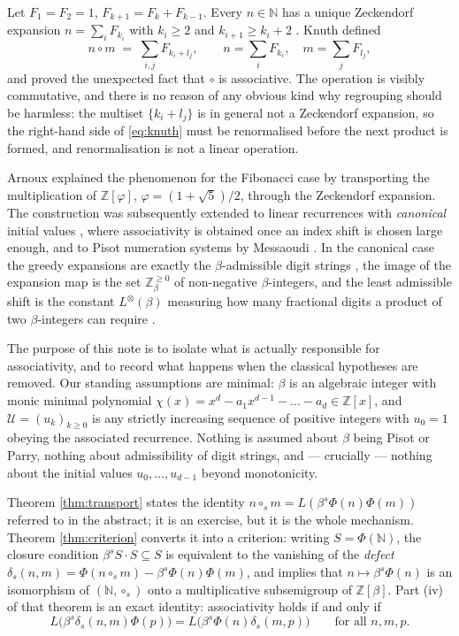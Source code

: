\documentclass[11pt,reqno]{amsart}
\theoremstyle{plain}
\theoremstyle{definition}
\newcommand{\Z}{\mathbb{Z}}
\newcommand{\N}{\mathbb{N}}
\newcommand{\Uu}{\mathcal{U}}
\begin{document}
Let $F_{1}=F_{2}=1$, $F_{k+1}=F_{k}+F_{k-1}$. Every $n\in\N$ has a unique Zeckendorf expansion
$n=\sum_{i}F_{k_{i}}$ with $k_{i}\ge2$ and $k_{i+1}\ge k_{i}+2$ \cite{Zeckendorf}. Knuth
\cite{Knuth} defined
\begin{equation}\label{eq:knuth}
  n\circ m \;=\; \sum_{i,j}F_{k_{i}+l_{j}},
  \qquad n=\sum_{i}F_{k_{i}},\quad m=\sum_{j}F_{l_{j}},
\end{equation}
and proved the unexpected fact that $\circ$ is associative. The operation is visibly commutative,
and there is no reason of any obvious kind why regrouping should be harmless: the multiset
$\{k_{i}+l_{j}\}$ is in general not a Zeckendorf expansion, so the right-hand side of
\eqref{eq:knuth} must be renormalised before the next product is formed, and renormalisation is not
a linear operation.

Arnoux \cite{Arnoux} explained the phenomenon for the Fibonacci case by transporting the
multiplication of $\Z[\varphi]$, $\varphi=(1+\sqrt5)/2$, through the Zeckendorf expansion. The
construction was subsequently extended to linear recurrences with \emph{canonical} initial values
\cite{Grabner}, where associativity is obtained once an index shift is chosen large enough, and to
Pisot numeration systems by Messaoudi \cite{Messaoudi1,Messaoudi2}. In the canonical case the
greedy expansions are exactly the $\beta$-admissible digit strings \cite{Bertrand}, the image of the
expansion map is the set $\Z_{\beta}^{\ge0}$ of non-negative $\beta$-integers, and the least
admissible shift is the constant $L^{\otimes}(\beta)$ measuring how many fractional digits a product
of two $\beta$-integers can require \cite{BFGK,AFMP}.

The purpose of this note is to isolate what is actually responsible for associativity, and to record
what happens when the classical hypotheses are removed. Our standing assumptions are minimal:
$\beta$ is an algebraic integer with monic minimal polynomial
$\chi(x)=x^{d}-a_{1}x^{d-1}-\dots-a_{d}\in\Z[x]$, and $\Uu=(u_{k})_{k\ge0}$ is any strictly
increasing sequence of positive integers with $u_{0}=1$ obeying the associated recurrence. Nothing
is assumed about $\beta$ being Pisot or Parry, nothing about admissibility of digit strings, and ---
crucially --- nothing about the initial values $u_{0},\dots,u_{d-1}$ beyond monotonicity.

Theorem \ref{thm:transport} states the identity
$n\circ_{s}m=L(\beta^{s}\Phi(n)\Phi(m))$ referred to in the abstract; it is an exercise, but it is
the whole mechanism. Theorem \ref{thm:criterion} converts it into a criterion: writing
$S=\Phi(\N)$, the closure condition $\beta^{s}S\cdot S\subseteq S$ is equivalent to the vanishing of
the \emph{defect} $\delta_{s}(n,m)=\Phi(n\circ_{s}m)-\beta^{s}\Phi(n)\Phi(m)$, and implies that
$n\mapsto\beta^{s}\Phi(n)$ is an isomorphism of $(\N,\circ_{s})$ onto a multiplicative subsemigroup
of $\Z[\beta]$. Part (iv) of that theorem is an exact identity: associativity holds if and only if
\[
  L\bigl(\beta^{s}\delta_{s}(n,m)\Phi(p)\bigr)=L\bigl(\beta^{s}\Phi(n)\delta_{s}(m,p)\bigr)
  \qquad\text{for all }n,m,p .
\]
\end{document}
